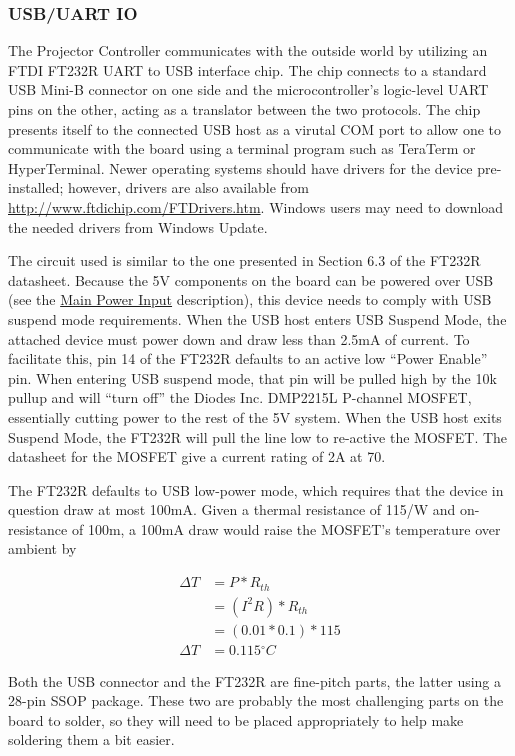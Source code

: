 \documentclass{article}
\newcommand{\degree}{\ensuremath{^{\circ}}}
\begin{document}
\subsubsection{USB/UART IO} \label{sssec:USBUART}
The Projector Controller communicates with the outside world by utilizing an FTDI FT232R UART to
USB interface chip.  The chip connects to a standard USB Mini-B connector on one side and the
microcontroller's logic-level UART pins on the other, acting as a translator between the two
protocols.  The chip presents itself to the connected USB host as a virutal COM port to
allow one to communicate with the board using a terminal program such as TeraTerm or HyperTerminal.
Newer operating systems should have drivers for the device pre-installed; however, drivers are also
available from \url{http://www.ftdichip.com/FTDrivers.htm}.  Windows users may need to download the
needed drivers from Windows Update.

The circuit used is similar to the one presented in Section 6.3 of the FT232R datasheet.  Because
the 5V components on the board can be powered over USB (see the \hyperref[sssec:MainPower]{Main
  Power Input} description), this device needs to comply with USB suspend mode requirements.  When
the USB host enters USB Suspend Mode, the attached device must power down and draw less than 2.5mA
of current.  To facilitate this, pin 14 of the FT232R defaults to an active low ``Power Enable'' pin.
When entering USB suspend mode, that pin will be pulled high by the 10k\textOmega{} pullup and will
``turn off'' the Diodes Inc. DMP2215L P-channel MOSFET, essentially cutting power to the rest of the
5V system.  When the USB host exits Suspend Mode, the FT232R will pull the line low to re-active the
MOSFET.  The datasheet for the MOSFET give a current rating of 2A at 70\textcelsius{}.

The FT232R defaults to USB low-power mode, which requires that the device in question draw at most
100mA.  Given a thermal resistance of 115\textcelsius{}/W and on-resistance of 100m\textOmega{}, a
100mA draw would raise the MOSFET's temperature over ambient by

\begin{align*}
    \Delta T &= P * R_{th} \\
    &= (I^2R) * R_{th} \\
    &= (0.01 * 0.1) * 115 \\
    \Delta T &= 0.115\degree C
\end{align*}

Both the USB connector and the FT232R are fine-pitch parts, the latter using a 28-pin SSOP package.
These two are probably the most challenging parts on the board to solder, so they will need to be
placed appropriately to help make soldering them a bit easier.
\end{document}
